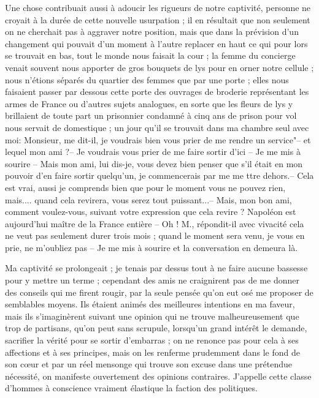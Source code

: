 \documentclass[11pt,a4paper]{report}
\begin{document}
Une chose contribuait aussi à adoucir les rigueurs de notre captivité, personne ne croyait à la durée de cette nouvelle usurpation ; il en résultait que non seulement on ne cherchait pas à aggraver notre position, mais que dans la prévision d'un changement qui pouvait d'un moment à l'autre replacer en haut ce qui pour lors se trouvait en bas, tout le monde nous faisait la cour ; la femme du concierge venait souvent nous apporter de gros bouquets de lys pour en orner notre cellule ; nous n'étions séparés du quartier des femmes que par une porte ; elles nous faisaient passer par dessous cette porte des ouvrages de broderie représentant les armes de France ou d'autres sujets analogues, en sorte que les fleurs de lys y brillaient de toute part un prisonnier condamné à cinq ans de prison pour vol nous servait de domestique ; un jour qu'il se trouvait dans ma chambre seul avec moi: Monsieur, me dit-il, je voudrais bien vous prier de me rendre un service"-- et lequel mon ami ?-- Je voudrais vous prier de me faire sortir d'ici -- Je me mis à sourire -- Mais mon ami, lui dis-je, vous devez bien penser que s'il était en mon pouvoir d'en faire sortir quelqu'un, je commencerais par me me ttre dehors.-- Cela est vrai, aussi je comprends bien que pour le moment vous ne pouvez rien, mais.... quand cela revirera, vous serez tout puissant...-- Mais, mon bon ami, comment voulez-vous, suivant votre expression que cela revire ? Napoléon est aujourd'hui maître de la France entière -- Oh ! M., répondit-il avec vivacité cela ne veut pas seulement durer trois mois ; quand le moment sera venu, je vous en prie, ne m'oubliez pas -- Je me mis à sourire et la conversation en demeura là.

Ma captivité se prolongeait ; je tenais par dessus tout à ne faire aucune bassesse pour y mettre un terme ; cependant des amis ne craignirent pas de me donner des conseils qui me firent rougir, par la seule pensée qu'on eut osé me proposer de semblables moyens. Ils étaient animés des meilleures intentions en ma faveur, mais ils s'imaginèrent suivant une opinion qui ne trouve malheureusement que trop de partisans, qu'on peut sans scrupule, lorsqu'un grand intérêt le demande, sacrifier la vérité pour se sortir d'embarras ; on ne renonce pas pour cela à ses affections et à ses principes, mais on les renferme prudemment dans le fond de son cœur et par un réel mensonge qui trouve son excuse dans une prétendue nécessité, on manifeste ouvertement des opinions contraires. J'appelle cette classe d'hommes à conscience vraiment élastique la faction des politiques.
\end{document}
